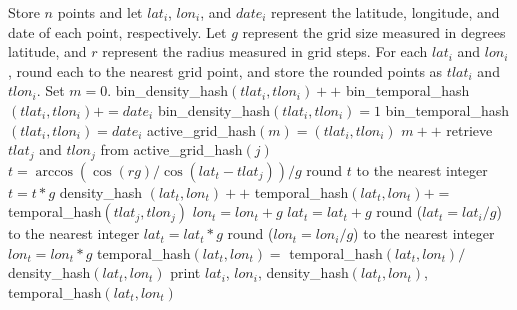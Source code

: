 \documentclass{report}
\begin{document}
\nopagecolor

\begin{algorithm}[H]
\begin{algorithmic}[1]
\STATE Store $n$ points and let $lat_i$, $lon_i$, and $date_i$ represent the latitude, longitude, and date of each point, respectively.  Let $g$ represent the grid size measured in degrees latitude, and $r$ represent the radius measured in grid steps. For each $lat_i$ and $lon_i$, round each to the nearest grid point, and store the rounded points as $tlat_i$ and $tlon_i$. Set $m=0$.
	\STATE bin\_density\_hash$(tlat_i,tlon_i)++$
	\STATE bin\_temporal\_hash$(tlat_i,tlon_i) += date_i $
	\ELSE
	\STATE bin\_density\_hash$(tlat_i,tlon_i)=1$
	\STATE bin\_temporal\_hash$(tlat_i,tlon_i)=date_i$
	\STATE active\_grid\_hash$(m) = (tlat_i,tlon_i)$
	\STATE $m++$
	\ENDIF
\ENDFOR
{}
	\STATE retrieve $tlat_j$ and $tlon_j$ from active\_grid\_hash$(j)$
		\STATE $t = \arccos(\cos(rg) / \cos(lat_t - tlat_j))/g$
		\STATE round $t$ to the nearest integer
		\STATE $t = t*g$
			\STATE density\_hash $(lat_t, lon_t) + + $
			\STATE temporal\_hash$(lat_t, lon_t) += \ $temporal\_hash$(tlat_j,tlon_j)$
			\STATE $lon_t = lon_t + g$
		\ENDFOR
		\STATE $lat_t = lat_t + g$
	\ENDFOR
\ENDFOR
{}
	\STATE round ($lat_t = lat_i/g$) to the nearest integer
	\STATE $lat_t = lat_t * g$
	\STATE round ($lon_t = lon_i/g$) to the nearest integer
	\STATE $lon_t = lon_t * g$
	\STATE temporal\_hash$(lat_t,lon_t) = $ temporal\_hash$(lat_t,lon_t) / $density\_hash$(lat_t,lon_t)$
	\STATE print $lat_i$, $lon_i$, density\_hash$(lat_t,lon_t)$, temporal\_hash$(lat_t, lon_t)$
\ENDFOR
\end{algorithmic}
\end{algorithm}
\end{document}
